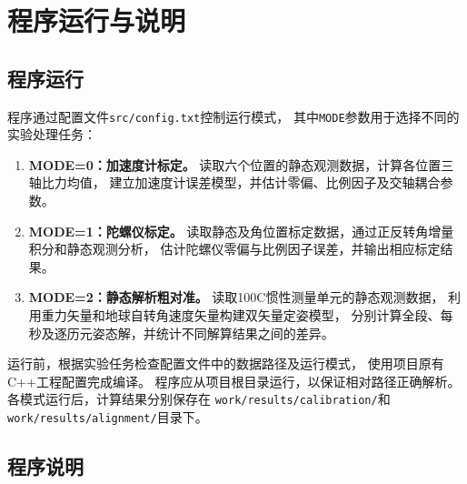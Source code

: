 \section{程序运行与说明}
\subsection{程序运行}

程序通过配置文件\texttt{src/config.txt}控制运行模式，
其中\texttt{MODE}参数用于选择不同的实验处理任务：

\begin{enumerate}
    \item \textbf{MODE=0：加速度计标定。}
    读取六个位置的静态观测数据，计算各位置三轴比力均值，
    建立加速度计误差模型，并估计零偏、比例因子及交轴耦合参数。

    \item \textbf{MODE=1：陀螺仪标定。}
    读取静态及角位置标定数据，通过正反转角增量积分和静态观测分析，
    估计陀螺仪零偏与比例因子误差，并输出相应标定结果。

    \item \textbf{MODE=2：静态解析粗对准。}
    读取100C惯性测量单元的静态观测数据，
    利用重力矢量和地球自转角速度矢量构建双矢量定姿模型，
    分别计算全段、每秒及逐历元姿态解，并统计不同解算结果之间的差异。
\end{enumerate}

运行前，根据实验任务检查配置文件中的数据路径及运行模式，
使用项目原有C++工程配置完成编译。
程序应从项目根目录运行，以保证相对路径正确解析。
各模式运行后，计算结果分别保存在
\texttt{work/results/calibration/}和
\texttt{work/results/alignment/}目录下。

\subsection{程序说明}
